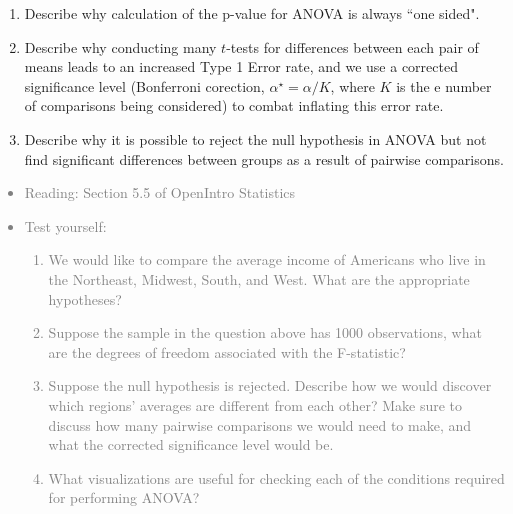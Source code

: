 \documentclass[11pt]{article}
\newcommand{\gray}[1]{\textcolor{gray}{#1}}
\begin{document}
\begin{enumerate}[resume]
\item Describe why calculation of the p-value for ANOVA is always ``one sided".

\item Describe why conducting many $t$-tests for differences between each pair of means leads to an increased Type 1 Error rate, and we use a corrected significance level (Bonferroni corection, $\alpha^\star = \alpha / K$, where $K$ is the e number of comparisons being considered) to combat inflating this error rate.

\item Describe why it is possible to reject the null hypothesis in ANOVA but not find significant differences between groups as a result of pairwise comparisons.

\end{enumerate}

\gray{
{\it
\vspace{-0.55cm}
\begin{itemize}
\renewcommand{\labelitemi}{{\textcolor{dark}{$\ast$}}}
\item Reading: Section 5.5 of OpenIntro Statistics
\item Test yourself:
\begin{enumerate}
\item We would like to compare the average income of Americans who live in the Northeast, Midwest, South, and West. What are the appropriate hypotheses?
\item Suppose the sample in the question above has 1000 observations, what are the degrees of freedom associated with the F-statistic?
\item Suppose the null hypothesis is rejected. Describe how we would discover which regions' averages are different from each other? Make sure to discuss how many pairwise comparisons we would need to make, and what the corrected significance level would be.
\item What visualizations are useful for checking each of the conditions required for performing ANOVA?
\end{enumerate}
\end{itemize}
}}
\end{document}
